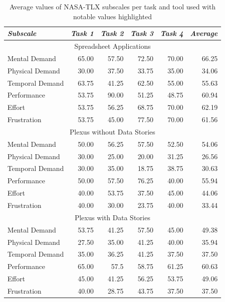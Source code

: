 \documentclass{sigchi}
\begin{document}
\begin{table}[]
\toprule
\small
\begin{tabular}{lrrrrr}
{\small\textit{Subscale}}
& {\small \textit{Task 1}}
& {\small \textit{Task 2}}
& {\small \textit{Task 3}} 
& {\small \textit{Task 4}}
& {\small \textit{Average}} \\
\midrule
\multicolumn{6}{c}{Spreadsheet Applications}                 \\
\midrule
Mental Demand   & 65.00     & 57.50   & 72.50 & 70.00  & \cellcolor[rgb]{0.78,0.78,0.78} 66.25  \\
Physical Demand & 30.00     & 37.50   & 33.75  & 35.00   & 34.06 \\
Temporal Demand & 63.75  & 41.25  & 62.50   & 55.00     & 55.63  \\
Performance     & 53.75  & 90.00     & 51.25  & 48.75  & 60.94 \\
Effort          & 53.75  & 56.25  & 68.75  & 70.00     & 62.19 \\
Frustration     & 53.75  & 45.00     & 77.50   & 70.00   & 61.56 \\
\midrule
\multicolumn{6}{c}{Plexus without Data Stories}                      \\
\midrule
Mental Demand   & 50.00  & 56.25  & 57.50  & 52.50  & \cellcolor[rgb]{0.78,0.78,0.78} 54.06   \\
Physical Demand & 30.00  & 25.00  & 20.00  & 31.25  & 26.56   \\
Temporal Demand & 30.00  & 35.00  & 18.75  & 38.75  & 30.63   \\
Performance     & 50.00  & 57.50  & 76.25  & 40.00  & \cellcolor[rgb]{0.78,0.78,0.78} 55.94   \\
Effort          & 40.00  & 53.75  & 37.50  & 45.00  & 44.06   \\
Frustration     & 40.00  & 30.00  & 23.75  & 40.00  & \cellcolor[rgb]{0.78,0.78,0.78} 33.44   \\
\midrule
\multicolumn{6}{c}{Plexus with Data Stories}                         \\
\midrule
Mental Demand   & 53.75  & 41.25  & 57.50  & 45.00 & 49.38  \\
Physical Demand & 27.50   & 35.00     & 41.25  & 40.00  & 35.94 \\
Temporal Demand & 35.00     & 36.25  & 41.25  & 37.50 & 37.50    \\
Performance     & 65.00     & 57.5   & 58.75  & 61.25  & \cellcolor[rgb]{0.78,0.78,0.78} 60.63  \\
Effort          & 45.00     & 41.25  & 56.25  & 53.75  & 49.06 \\
Frustration     & 40.00     & 28.75  & 43.75  & 37.50   & 37.50   
\end{tabular}
\bottomrule
\caption{Average values of NASA-TLX subscales per task and tool used with notable values highlighted}~\label{tab:tlx}
\end{table}
\end{document}

